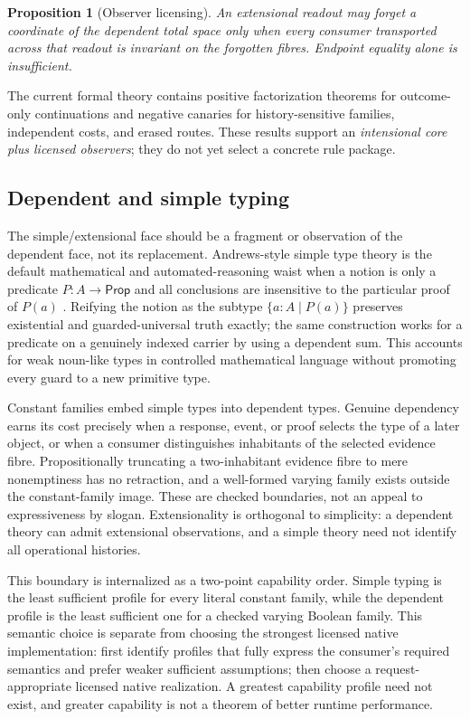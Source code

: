 \documentclass[11pt]{article}
\newtheorem{proposition}[theorem]{Proposition}
\theoremstyle{definition}
\theoremstyle{remark}
\begin{document}
\begin{proposition}[Observer licensing]
An extensional readout may forget a coordinate of the dependent total space only
when every consumer transported across that readout is invariant on the forgotten
fibres.  Endpoint equality alone is insufficient.
\end{proposition}

The current formal theory contains positive factorization theorems for
outcome-only continuations and negative canaries for history-sensitive families,
independent costs, and erased routes.  These results support an
\emph{intensional core plus licensed observers}; they do not yet select a concrete
rule package.

\subsection{Dependent and simple typing}

The simple/extensional face should be a fragment or observation of the dependent
face, not its replacement.  Andrews-style simple type theory is the default
mathematical and automated-reasoning waist when a notion is only a predicate
$P:A\to\mathsf{Prop}$ and all conclusions are insensitive to the particular
proof of $P(a)$ \cite{AndrewsTypeTheory,AndrewsAutomatingHOL}.  Reifying the notion as the subtype
$\{a:A\mid P(a)\}$ preserves existential and guarded-universal truth exactly;
the same construction works for a predicate on a genuinely indexed carrier by
using a dependent sum.  This accounts for weak noun-like types in controlled
mathematical language without promoting every guard to a new primitive type.

Constant families embed simple types into dependent types.  Genuine dependency
earns its cost precisely when a response, event, or proof selects the type of a
later object, or when a consumer distinguishes inhabitants of the selected
evidence fibre.  Propositionally truncating a two-inhabitant evidence fibre to
mere nonemptiness has no retraction, and a well-formed varying family exists
outside the constant-family image.  These are checked boundaries, not an appeal
to expressiveness by slogan.  Extensionality is orthogonal to simplicity: a
dependent theory can admit extensional observations, and a simple theory need
not identify all operational histories.

This boundary is internalized as a two-point capability order.  Simple typing
is the least sufficient profile for every literal constant family, while the
dependent profile is the least sufficient one for a checked varying Boolean
family.  This semantic choice is separate from choosing the strongest licensed
native implementation: first identify profiles that fully express the
consumer's required semantics and prefer weaker sufficient assumptions;
then choose a request-appropriate licensed native realization. A greatest
capability profile need not exist, and greater capability is not a theorem
of better runtime performance.
\end{document}
